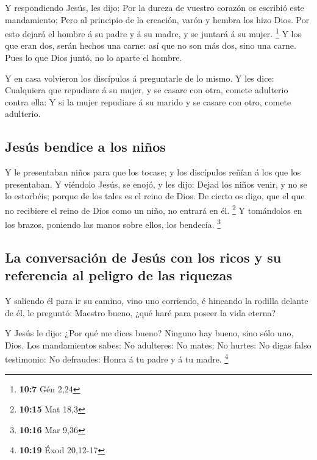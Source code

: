  Y respondiendo Jesús, les dijo: Por la dureza de vuestro
corazón os escribió este mandamiento;  Pero al principio
de la creación, varón y hembra los hizo Dios.  Por esto
dejará el hombre á su padre y á su madre, y se juntará á su mujer.
\footnote{\textbf{10:7} Gén 2,24}  Y los que eran dos,
serán hechos una carne: así que no son más dos, sino una carne.
 Pues lo que Dios juntó, no lo aparte el hombre.

 Y en casa volvieron los discípulos á preguntarle de lo
mismo.  Y les dice: Cualquiera que repudiare á su mujer,
y se casare con otra, comete adulterio contra ella:  Y si
la mujer repudiare á su marido y se casare con otro, comete adulterio.

\hypertarget{jesuxfas-bendice-a-los-niuxf1os}{%
\subsection{Jesús bendice a los
niños}\label{jesuxfas-bendice-a-los-niuxf1os}}

 Y le presentaban niños para que los tocase; y los
discípulos reñían á los que los presentaban.  Y viéndolo
Jesús, se enojó, y les dijo: Dejad los niños venir, y no se lo
estorbéis; porque de los tales es el reino de Dios.  De
cierto os digo, que el que no recibiere el reino de Dios como un niño,
no entrará en él. \footnote{\textbf{10:15} Mat 18,3}  Y
tomándolos en los brazos, poniendo las manos sobre ellos, los bendecía.
\footnote{\textbf{10:16} Mar 9,36}

\hypertarget{la-conversaciuxf3n-de-jesuxfas-con-los-ricos-y-su-referencia-al-peligro-de-las-riquezas}{%
\subsection{La conversación de Jesús con los ricos y su referencia al
peligro de las
riquezas}\label{la-conversaciuxf3n-de-jesuxfas-con-los-ricos-y-su-referencia-al-peligro-de-las-riquezas}}

 Y saliendo él para ir su camino, vino uno corriendo, é
hincando la rodilla delante de él, le preguntó: Maestro bueno, ¿qué haré
para poseer la vida eterna?

 Y Jesús le dijo: ¿Por qué me dices bueno? Ninguno hay
bueno, sino sólo uno, Dios.  Los mandamientos sabes: No
adulteres: No mates: No hurtes: No digas falso testimonio: No defraudes:
Honra á tu padre y á tu madre. \footnote{\textbf{10:19} Éxod 20,12-17}

